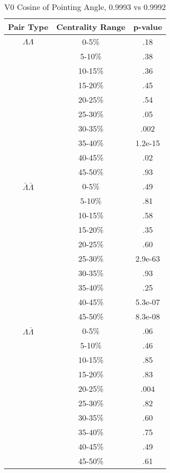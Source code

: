 \begin{table}
\begin{minipage}{18pc}
\caption {V0 Cosine of Pointing Angle, 0.9993 vs 0.9992} \label{tab:V0CosPointingPvalueTests9993vs9992}
\begin{center}
\begin{tabular}{| c | c | c |}
  \hline                       
  Pair Type & Centrality Range & p-value \\
  \hline
  $\Lambda\Lambda$ & 0-5\% & .18 \\
   & 5-10\%  & .38 \\
   & 10-15\% & .36 \\
   & 15-20\% & .45 \\
   & 20-25\% & .54 \\
   & 25-30\% & .05 \\
   & 30-35\% & .002 \\
   & 35-40\% & 1.2e-15 \\
   & 40-45\% & .02 \\
   & 45-50\% & .93 \\
   \hline
  $\bar{\Lambda}\bar{\Lambda}$ &  0-5\% & .49 \\
   & 5-10\% & .81 \\
   & 10-15\% & .58 \\
   & 15-20\% & .35 \\
   & 20-25\% & .60 \\
   & 25-30\% & 2.9e-63 \\
   & 30-35\% & .93 \\
   & 35-40\% & .25 \\
   & 40-45\% & 5.3e-07 \\
   & 45-50\% & 8.3e-08 \\
   \hline
  $\Lambda\bar{\Lambda}$ &  0-5\% & .06 \\
   & 5-10\% & .46 \\
   & 10-15\% & .85 \\
   & 15-20\% & .83 \\
   & 20-25\% & .004 \\
   & 25-30\% & .82 \\
   & 30-35\% & .60 \\
   & 35-40\% & .75 \\
   & 40-45\% & .49 \\
   & 45-50\% & .61 \\
  \hline  
\end{tabular}
\end{center}
\end{minipage}

\end{table}
